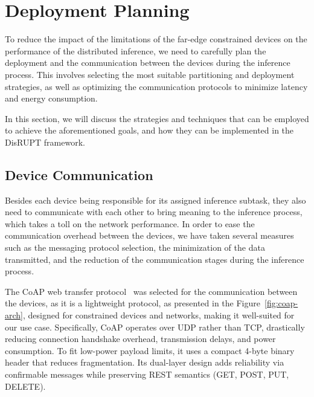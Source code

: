 \section{Deployment Planning}\label{sec:se45}

To reduce the impact of the limitations of the far-edge constrained devices on the 
performance of the distributed inference, we need to carefully plan the deployment 
and the communication between the devices during the inference process. 
This involves selecting the most suitable partitioning and deployment strategies, 
as well as optimizing the communication protocols to minimize latency and 
energy consumption. 

In this section, we will discuss the strategies and techniques that can be employed
to achieve the aforementioned goals, and how they can be implemented in the 
\ac{DisRUPT} framework.

\subsection{Device Communication}\label{sec:se451}


Besides each device being responsible for its assigned inference subtask, they also
need to communicate with each other to bring meaning to the inference process, which 
takes a toll on the network performance.
In order to ease the communication overhead between the devices, we have taken several
measures such as the messaging protocol selection, the minimization of the data
transmitted, and the reduction of the communication stages during the inference process.

The CoAP web transfer protocol~\cite{coap-rfc7252} was selected for the communication
between the devices, as it is a lightweight protocol, as presented in the 
Figure~\ref{fig:coap-arch}, designed for constrained devices
and networks, making it well-suited for our use case. Specifically, CoAP operates over
UDP rather than TCP, drastically reducing connection handshake overhead, transmission
delays, and power consumption. To fit low-power payload limits, it uses a compact
4-byte binary header that reduces fragmentation. Its dual-layer design adds reliability
via confirmable messages while preserving REST semantics (GET, POST, PUT, DELETE).

